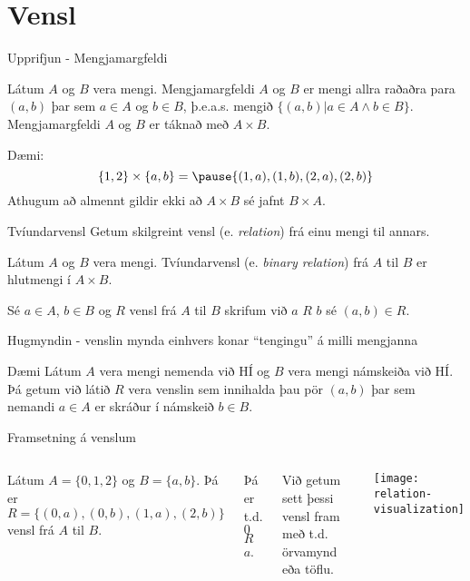 \documentclass[handout]{beamer}
\begin{document}
\section{Vensl}

\begin{frame}{Upprifjun - Mengjamargfeldi}
\begin{tcolorbox}[title=Mengjamargfeldi]
Látum $A$ og $B$ vera mengi. Mengjamargfeldi $A$ og $B$ er mengi allra raðaðra para $(a, b)$ þar sem $a \in A$ og $b \in B$, þ.e.a.s. mengið $\{(a, b) | a \in A \land b \in B\}$. Mengjamargfeldi $A$ og $B$ er táknað með $A \times B$.
\end{tcolorbox}
Dæmi:
\[
 \{1, 2\} \times \{a, b\} = \pause \{(1, a), (1, b), (2, a), (2, b)\}
\]
Athugum að almennt gildir ekki að $A \times B$ sé jafnt $B \times A$.
\end{frame}

\begin{frame}{Tvíundarvensl}
Getum skilgreint vensl (e. \emph{relation}) frá einu mengi til annars.

\begin{tcolorbox}[title=Tvíundarvensl]
Látum $A$ og $B$ vera mengi. Tvíundarvensl (e. \emph{binary relation}) frá $A$ til $B$ er hlutmengi í $A \times B$.
\end{tcolorbox}
Sé $a \in A$, $b \in B$ og $R$ vensl frá $A$ til $B$ skrifum við $a$ $R$ $b$ sé $(a,b) \in R$.

\vspace{0.5cm}

Hugmyndin - venslin mynda einhvers konar ``tengingu'' á milli mengjanna
\end{frame}

\begin{frame}{Dæmi}
Látum $A$ vera mengi nemenda við HÍ og $B$ vera mengi námskeiða við HÍ. Þá getum við látið $R$ vera venslin sem innihalda þau pör $(a,b)$ þar sem nemandi $a \in A$ er skráður í námskeið $b \in B$.
\end{frame}

\begin{frame}{Framsetning á venslum}
\begin{columns}
Látum $A = \{0, 1, 2\}$ og $B = \{a, b\}$. Þá er $R = \{(0,a), (0,b), (1,a), (2,b)\}$ vensl frá $A$ til $B$. 

Þá er t.d. $0$ $R$ $a$.

Við getum sett þessi vensl fram með t.d. örvamynd eða töflu.
\begin{center}
\texttt{[image: relation-visualization]}
\end{center}
\end{columns}
\end{frame}
\end{document}
